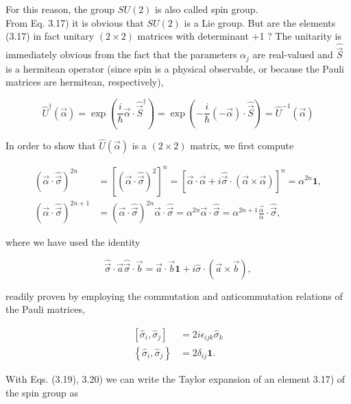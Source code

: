 \documentclass[10pt, letterpaper]{article}
\begin{document}
For this reason, the group $S U(2)$ is also called spin group.\\
From Eq. 3.17) it is obvious that $S U(2)$ is a Lie group. But are the elements (3.17) in fact unitary $(2 \times 2)$ matrices with determinant +1 ? The unitarity is immediately obvious from the fact that the parameters $\alpha_{j}$ are real-valued and $\hat{\vec{S}}$ is a hermitean operator (since spin is a physical observable, or because the Pauli matrices are hermitean, respectively),

$$
\hat{U}^{\dagger}(\vec{\alpha})=\exp \left(\frac{i}{\hbar} \vec{\alpha} \cdot \hat{\vec{S}}^{\dagger}\right)=\exp \left(-\frac{i}{\hbar}(-\vec{\alpha}) \cdot \hat{\vec{S}}\right)=\hat{U}^{-1}(\vec{\alpha})
$$

In order to show that $\hat{U}(\vec{\alpha})$ is a $(2 \times 2)$ matrix, we first compute

$$
\begin{aligned}
(\vec{\alpha} \cdot \hat{\vec{\sigma}})^{2 n} & =\left[(\vec{\alpha} \cdot \hat{\vec{\sigma}})^{2}\right]^{n}=[\vec{\alpha} \cdot \vec{\alpha}+i \hat{\vec{\sigma}} \cdot(\vec{\alpha} \times \vec{\alpha})]^{n}=\alpha^{2 n} \mathbf{1}, \\
(\vec{\alpha} \cdot \hat{\vec{\sigma}})^{2 n+1} & =(\vec{\alpha} \cdot \hat{\vec{\sigma}})^{2 n} \vec{\alpha} \cdot \hat{\vec{\sigma}}=\alpha^{2 n} \vec{\alpha} \cdot \hat{\vec{\sigma}}=\alpha^{2 n+1} \frac{\vec{\alpha}}{\alpha} \cdot \hat{\vec{\sigma}},
\end{aligned}
$$

where we have used the identity

$$
\hat{\vec{\sigma}} \cdot \vec{a} \hat{\vec{\sigma}} \cdot \vec{b}=\vec{a} \cdot \vec{b} \mathbf{1}+i \hat{\sigma} \cdot(\vec{a} \times \vec{b}),
$$

readily proven by employing the commutation and anticommutation relations of the Pauli matrices,

$$
\begin{aligned}
{\left[\hat{\sigma}_{i}, \hat{\sigma}_{j}\right] } & =2 i \epsilon_{i j k} \hat{\sigma}_{k} \\
\left\{\hat{\sigma}_{i}, \hat{\sigma}_{j}\right\} & =2 \delta_{i j} \mathbf{1} .
\end{aligned}
$$

With Eqs. (3.19), 3.20) we can write the Taylor expansion of an element 3.17) of the spin group as
\end{document}

